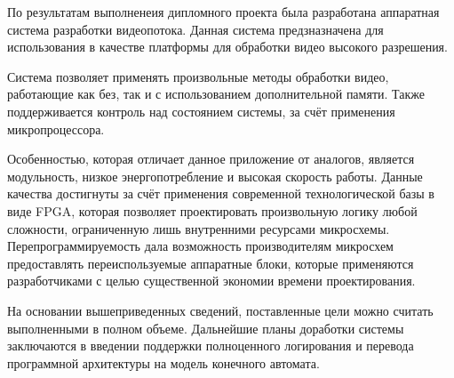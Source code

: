 
По результатам выполненеия дипломного проекта была разработана
аппаратная система разработки видеопотока. Данная система предзназначена
для использования в качестве платформы для обработки видео высокого разрешения.

Система позволяет применять произвольные методы обработки видео, работающие как без,
так и с использованием дополнительной памяти. Также поддерживается контроль над состоянием
системы, за счёт применения микропроцессора.

Особенностью, которая отличает данное приложение от аналогов, является модульность,
низкое энергопотребление и высокая скорость работы. Данные качества достигнуты за счёт применения
современной технологической базы в виде FPGA, которая позволяет проектировать произвольную
логику любой сложности, ограниченную лишь внутренними ресурсами микросхемы. Перепрограммируемость
дала возможность производителям микросхем предоставлять переиспользуемые аппаратные блоки,
которые применяются разработчиками с целью существенной экономии времени проектирования.

На основании вышеприведенных сведений, поставленные цели можно считать выполненными в полном объеме.
Дальнейшие планы доработки системы заключаются в введении поддержки полноценного логирования
и перевода программной архитектуры на модель конечного автомата.
